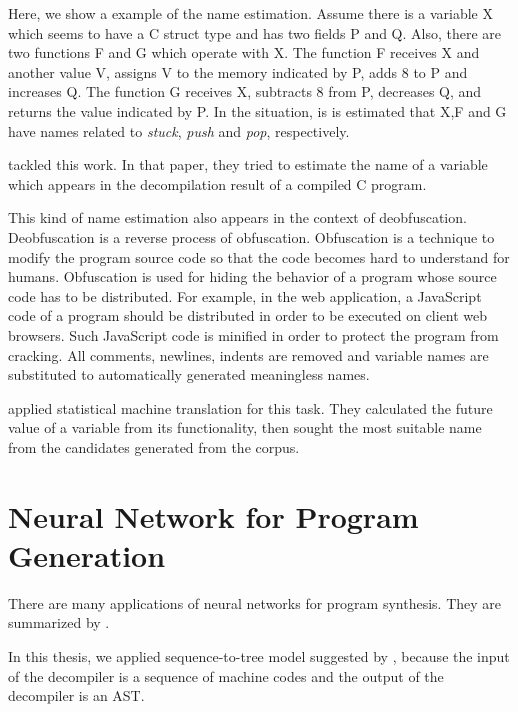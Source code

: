 \documentclass[11pt]{jarticle}
\begin{document}
Here, we show a example of the name estimation.
Assume there is a variable X which seems to have a C struct type and has two fields P and Q.
Also, there are two functions F and G which operate with X. 
The function F receives X and another value V, assigns V to the memory indicated by P, adds 8 to P and increases Q. 
The function G receives X, subtracts 8 from P, decreases Q, and returns the value indicated by P.
In the situation, is is estimated that X,F and G have names related to {\sl stuck}, {\sl push} and {\sl pop}, respectively.

\citet{name_recover_from_decompile_result} tackled this work. 
In that paper, they tried to estimate the name of a variable which appears in the decompilation result of a compiled C program.

This kind of name estimation also appears in the context of deobfuscation.
\citep{deobfsucation_matome}
Deobfuscation is a reverse process of obfuscation.
Obfuscation is a technique to modify the program source code so that the code becomes hard to understand for humans. 
Obfuscation is used for hiding the behavior of a program whose source code has to be distributed.
For example, in the web application, a JavaScript code of a program should be distributed in order to be executed on client web browsers.
Such JavaScript code is minified in order to protect the program from cracking. 
All comments, newlines, indents are removed and variable names are substituted to automatically generated meaningless names. 

\citet{JSNaughty} applied statistical machine translation for this task. 
They calculated the future value of a variable from its functionality, then 
sought the most suitable name from the candidates generated from the corpus.


\section{Neural Network for Program Generation}

There are many applications of neural networks for program synthesis. They are summarized by \citet{deep_programming_matome}.

In this thesis, we applied sequence-to-tree model suggested by \citet{Seq2Tree}, 
because the input of the decompiler is a sequence of machine codes and
the output of the decompiler is an AST.
\end{document}

